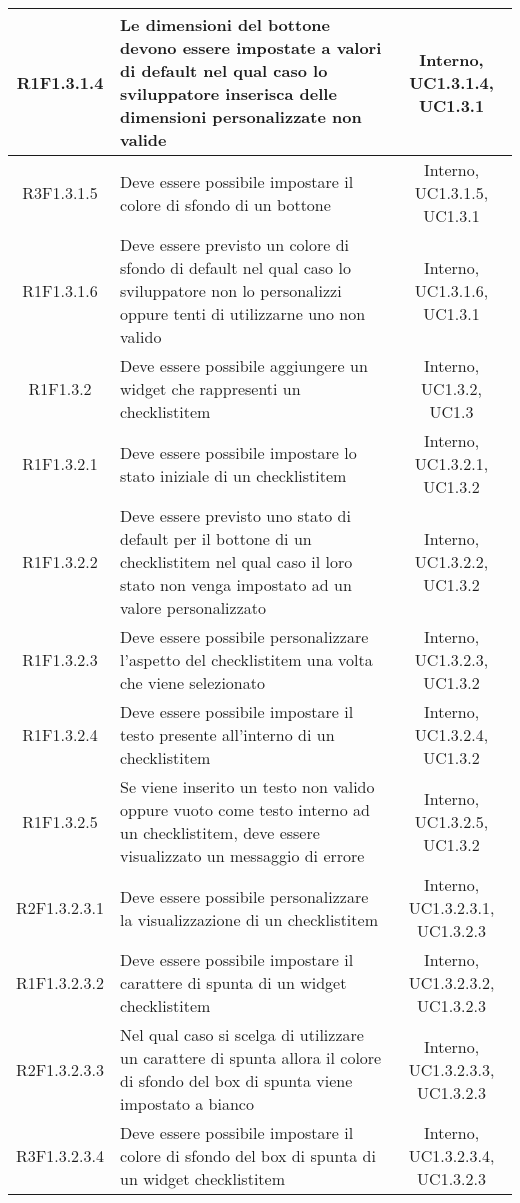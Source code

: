 \begin{longtable}{|c|>{\centering}m{7cm}|c|}
			\hline
			R1F1.3.1.4 & Le dimensioni del bottone devono essere impostate a valori di default nel qual caso lo sviluppatore inserisca delle dimensioni personalizzate non valide & Interno, UC1.3.1.4, UC1.3.1 \\
			\hline
			R3F1.3.1.5 & Deve essere possibile impostare il colore di sfondo di un bottone & Interno, UC1.3.1.5, UC1.3.1 \\
			\hline
			R1F1.3.1.6 & Deve essere previsto un colore di sfondo di default nel qual caso lo sviluppatore non lo personalizzi oppure tenti di utilizzarne uno non valido & Interno, UC1.3.1.6, UC1.3.1 \\
			\hline
			R1F1.3.2 & Deve essere possibile aggiungere un widget che rappresenti un checklistitem & Interno, UC1.3.2, UC1.3 \\
			\hline
			R1F1.3.2.1 & Deve essere possibile impostare lo stato iniziale di un checklistitem & Interno, UC1.3.2.1, UC1.3.2 \\
		\hline
		R1F1.3.2.2 & Deve essere previsto uno stato di default per il bottone di un checklistitem nel qual caso il loro stato non venga impostato ad un valore personalizzato & Interno, UC1.3.2.2, UC1.3.2 \\
		\hline
		R1F1.3.2.3 & Deve essere possibile personalizzare l'aspetto del checklistitem una volta che viene selezionato & Interno, UC1.3.2.3, UC1.3.2 \\
		\hline
		R1F1.3.2.4 & Deve essere possibile impostare il testo presente all'interno di un checklistitem & Interno, UC1.3.2.4, UC1.3.2 \\
		\hline
		R1F1.3.2.5 & Se viene inserito un testo non valido oppure vuoto come testo interno ad un checklistitem, deve essere visualizzato un messaggio di errore & Interno, UC1.3.2.5, UC1.3.2 \\
		\hline
		R2F1.3.2.3.1 & Deve essere possibile personalizzare la visualizzazione di un checklistitem & Interno, UC1.3.2.3.1, UC1.3.2.3 \\ 
		\hline
		R1F1.3.2.3.2 & Deve essere possibile impostare il carattere di spunta di un widget checklistitem & Interno, UC1.3.2.3.2, UC1.3.2.3 \\ 
		\hline
		R2F1.3.2.3.3 & Nel qual caso si scelga di utilizzare un carattere di spunta allora il colore di sfondo del box di spunta viene impostato a bianco & Interno, UC1.3.2.3.3, UC1.3.2.3 \\ 
		\hline
		R3F1.3.2.3.4 & Deve essere possibile impostare il colore di sfondo del box di spunta di un widget checklistitem & Interno, UC1.3.2.3.4, UC1.3.2.3 \\ 

\end{longtable}
